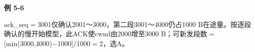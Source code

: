 {\color{ink}\bfseries 例 5-6}\par\vspace{1bp}ack\_seq\(=\allowbreak{}\)3001仅确认2001～3000，第二段3001～4000仍占1000 B在途量。按逐段确认的慢开始模型，此ACK使cwnd由2000增至3000 B；可新发段数\(=\allowbreak{}\)[min(3000,\allowbreak{}4000)\(-\)1000]/\allowbreak{}1000\(=\allowbreak{}\)2，选A。
